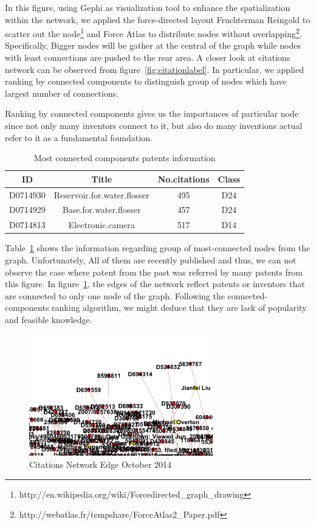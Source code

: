 \documentclass{article}
\begin{document}
In this figure, using Gephi as visualization tool to enhance the spatialization within the network, we applied the force-directed layout Fruchterman Reingold to scatter out the node\footnote{http://en.wikipedia.org/wiki/Force\-directed\_graph\_drawing} and Force Atlas to distribute nodes without overlapping\footnote{http://webatlas.fr/tempshare/ForceAtlas2\_Paper.pdf}. Specifically, Bigger nodes will be gather at the central of the graph while nodes with least connections are pushed to the rear area. A closer look at citations network can be observed from figure~\ref{fig:citationlabel}. In particular, we applied ranking by connected components to distinguish group of nodes which have largest number of connections.\par
Ranking by connected components gives us the importances of particular node since not only many inventors connect to it, but also do many inventions actual refer to it as a fundamental foundation.  
\begin{table}[H]
\centering
\begin{tabular}{|c|c|c|c|}  \hline
 ID&Title&No.citations&Class\\ \hline
 D0714930&Reservoir.for.water.flosser&495&D24\\ \hline
D0714929&Base.for.water.flosser&457 &D24\\ \hline
D0714813&Electronic.camera&517&D14 \\ \hline
\end{tabular}
\caption{Most connected components patents information}\label{tab:component}
\end{table}
Table~\ref{tab:component} shows the information regarding group of most-connected nodes from the graph. Unfortunately, All of them are recently published and thus, we can not observe the case where patent from the past was referred by many patents from this figure.
In figure~\ref{fig:endcitation}, the edges of the network reflect patents or inventors that are connected to only one node of the graph. Following the connected-components ranking algorithm, we might deduce that they are lack of popularity and feasible knowledge.
 \begin{figure}[H]
\centering
\includegraphics[width=80mm]{endcitation.png}
\caption{ Citations Network Edge October 2014 }\label{fig:endcitation}
\end{figure}
\end{document}
